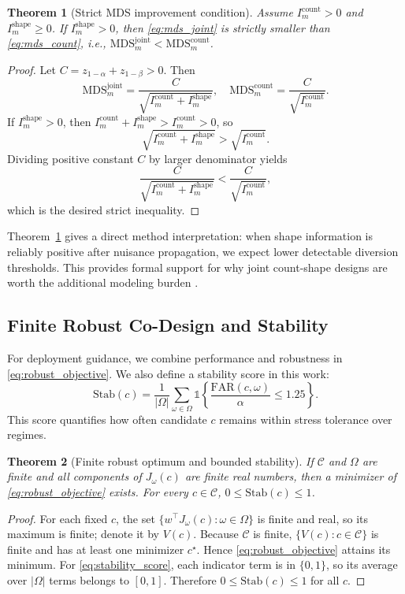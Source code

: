 \documentclass{article} %
\newtheorem{theorem}{Theorem}[section]
\begin{document}
\begin{theorem}[Strict MDS improvement condition]\label{thm:mds}
Assume $I_m^{\mathrm{count}}>0$ and $I_m^{\mathrm{shape}}\ge 0$. If $I_m^{\mathrm{shape}}>0$, then \eqref{eq:mds_joint} is strictly smaller than \eqref{eq:mds_count}, i.e., $\mathrm{MDS}^{\mathrm{joint}}_m<\mathrm{MDS}^{\mathrm{count}}_m$.
\end{theorem}
\begin{proof}
Let $C=z_{1-\alpha}+z_{1-\beta}>0$. Then
\[
\mathrm{MDS}^{\mathrm{joint}}_m = \frac{C}{\sqrt{I_m^{\mathrm{count}}+I_m^{\mathrm{shape}}}},\quad
\mathrm{MDS}^{\mathrm{count}}_m = \frac{C}{\sqrt{I_m^{\mathrm{count}}}}.
\]
If $I_m^{\mathrm{shape}}>0$, then $I_m^{\mathrm{count}}+I_m^{\mathrm{shape}}>I_m^{\mathrm{count}}>0$, so
\[
\sqrt{I_m^{\mathrm{count}}+I_m^{\mathrm{shape}}}>\sqrt{I_m^{\mathrm{count}}}.
\]
Dividing positive constant $C$ by larger denominator yields
\[
\frac{C}{\sqrt{I_m^{\mathrm{count}}+I_m^{\mathrm{shape}}}} < \frac{C}{\sqrt{I_m^{\mathrm{count}}}},
\]
which is the desired strict inequality.
\end{proof}

Theorem~\ref{thm:mds} gives a direct method interpretation: when shape information is reliably positive after nuisance propagation, we expect lower detectable diversion thresholds. This provides formal support for why joint count-shape designs are worth the additional modeling burden \citep{SRC014,SRC023,SRC030}.

\subsection{Finite Robust Co-Design and Stability}
For deployment guidance, we combine performance and robustness in \eqref{eq:robust_objective}. We also define a stability score in this work:
\begin{equation}
\mathrm{Stab}(c)=\frac{1}{|\Omega|}\sum_{\omega\in\Omega}\mathbb{1}\left\{\frac{\mathrm{FAR}(c,\omega)}{\alpha}\le 1.25\right\}.
\label{eq:stability_score}
\end{equation}
This score quantifies how often candidate $c$ remains within stress tolerance over regimes.

\begin{theorem}[Finite robust optimum and bounded stability]\label{thm:codesign}
If $\mathcal{C}$ and $\Omega$ are finite and all components of $J_\omega(c)$ are finite real numbers, then a minimizer of \eqref{eq:robust_objective} exists. For every $c\in\mathcal{C}$, $0\le\mathrm{Stab}(c)\le 1$.
\end{theorem}
\begin{proof}
For each fixed $c$, the set $\{w^\top J_\omega(c):\omega\in\Omega\}$ is finite and real, so its maximum is finite; denote it by $V(c)$. Because $\mathcal{C}$ is finite, $\{V(c):c\in\mathcal{C}\}$ is finite and has at least one minimizer $c^\star$. Hence \eqref{eq:robust_objective} attains its minimum. For \eqref{eq:stability_score}, each indicator term is in $\{0,1\}$, so its average over $|\Omega|$ terms belongs to $[0,1]$. Therefore $0\le\mathrm{Stab}(c)\le 1$ for all $c$.
\end{proof}
\end{document}
